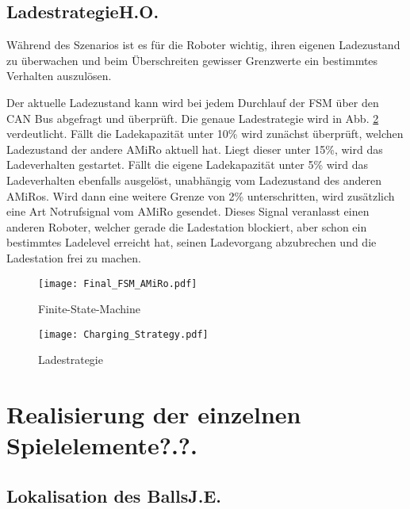 \subsection[Ladestrategie]{Ladestrategie\hfill {\normalsize H.O.}}
Während des Szenarios ist es für die Roboter wichtig, ihren eigenen Ladezustand zu überwachen und beim Überschreiten gewisser Grenzwerte ein bestimmtes Verhalten auszulösen.

Der aktuelle Ladezustand kann wird bei jedem Durchlauf der FSM über den CAN Bus abgefragt und überprüft. Die genaue Ladestrategie wird in Abb. \ref{fig:charging-strategy} verdeutlicht. Fällt die Ladekapazität unter 10\%  wird zunächst überprüft, welchen Ladezustand der andere AMiRo aktuell hat. Liegt dieser unter 15\%, wird das Ladeverhalten gestartet. Fällt die eigene Ladekapazität unter 5\% wird das Ladeverhalten ebenfalls ausgelöst, unabhängig vom Ladezustand des anderen AMiRos. Wird dann eine weitere Grenze von 2\% unterschritten, wird zusätzlich eine Art Notrufsignal vom AMiRo gesendet. Dieses Signal veranlasst einen anderen Roboter, welcher gerade die Ladestation blockiert, aber schon ein bestimmtes Ladelevel erreicht hat, seinen Ladevorgang abzubrechen und die Ladestation frei zu machen.

\begin{figure}
	\begin{center}
		\texttt{[image: Final\_FSM\_AMiRo.pdf]} 	
		\caption{Finite-State-Machine}
		\label{fig:fsm-amiro}
	\end{center}
\end{figure}
\begin{figure}
	\begin{center}
		\texttt{[image: Charging\_Strategy.pdf]} 	
		\caption{Ladestrategie}
		\label{fig:charging-strategy}
	\end{center}
\end{figure}


\section[Realisierung der einzelnen Spielelemente]{Realisierung der einzelnen Spielelemente\hfill {\normalsize ?.?.}}%

\subsection[Lokalisation des Balls]{Lokalisation des Balls\hfill {\normalsize J.E.}} %

